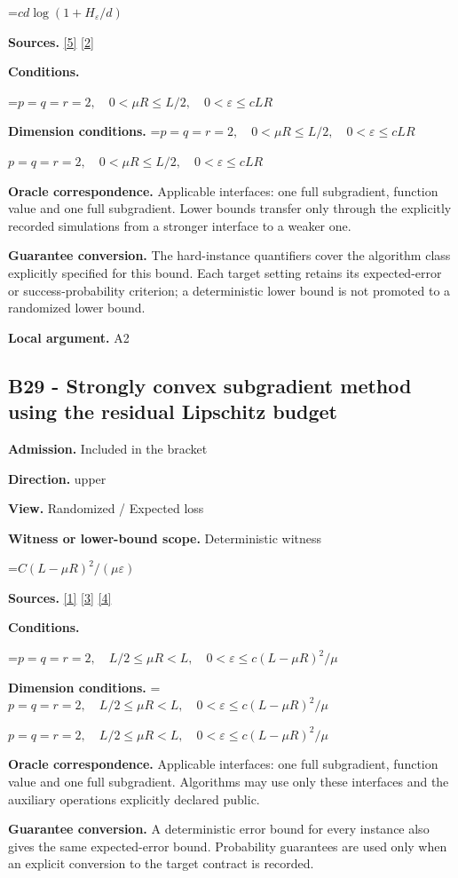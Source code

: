 \documentclass[10pt,a4paper]{article}
\newcommand{\AtlasMath}[1]{\par\begingroup\centering\setbox0=\hbox{$\displaystyle #1$}\ifdim\wd0>1.4\linewidth\typeout{ATLAS WIDE FORMULA: \the\wd0}\fi\ifdim\wd0>\linewidth\resizebox{\linewidth}{!}{\box0}\else\box0\fi\par\endgroup}
\newcommand{\AtlasInlineMath}[1]{\begingroup\setbox0=\hbox{$#1$}\ifdim\wd0>.4\linewidth\endgroup\AtlasMath{#1}\else\endgroup$#1$\fi}
\begin{document}
\AtlasMath{c d\log(1+H_\varepsilon/d)}
\textbf{Sources.} \href{https://arxiv.org/pdf/1407.5144}{[5]} \href{https://arxiv.org/pdf/1401.1792}{[2]}

\textbf{Conditions.} 
\AtlasMath{p=q=r=2,\quad0<\mu R\le L/2,\quad0<\varepsilon\le cLR}


\textbf{Dimension conditions.} \AtlasInlineMath{p=q=r=2,\quad0<\mu R\le L/2,\quad0<\varepsilon\le cLR}

\textbf{Oracle correspondence.} Applicable interfaces: one full subgradient, function value and one full subgradient. Lower bounds transfer only through the explicitly recorded simulations from a stronger interface to a weaker one.

\textbf{Guarantee conversion.} The hard-instance quantifiers cover the algorithm class explicitly specified for this bound. Each target setting retains its expected-error or success-probability criterion; a deterministic lower bound is not promoted to a randomized lower bound.

\textbf{Local argument.} A2

\subsection{B29 - Strongly convex subgradient method using the residual Lipschitz budget}
\textbf{Admission.} Included in the bracket

\textbf{Direction.} upper

\textbf{View.} Randomized / Expected loss

\textbf{Witness or lower-bound scope.} Deterministic witness

\AtlasMath{C(L-\mu R)^2/(\mu\varepsilon)}
\textbf{Sources.} \href{https://arxiv.org/pdf/1405.4980}{[1]} \href{https://www2.isye.gatech.edu/~nemirovs/MOR_AccuracyCertificates.pdf}{[3]} \href{https://arxiv.org/pdf/2609.20701}{[4]}

\textbf{Conditions.} 
\AtlasMath{p=q=r=2,\quad L/2\le\mu R<L,\quad0<\varepsilon\le c(L-\mu R)^2/\mu}


\textbf{Dimension conditions.} \AtlasInlineMath{p=q=r=2,\quad L/2\le\mu R<L,\quad0<\varepsilon\le c(L-\mu R)^2/\mu}

\textbf{Oracle correspondence.} Applicable interfaces: one full subgradient, function value and one full subgradient. Algorithms may use only these interfaces and the auxiliary operations explicitly declared public.

\textbf{Guarantee conversion.} A deterministic error bound for every instance also gives the same expected-error bound. Probability guarantees are used only when an explicit conversion to the target contract is recorded.
\end{document}
